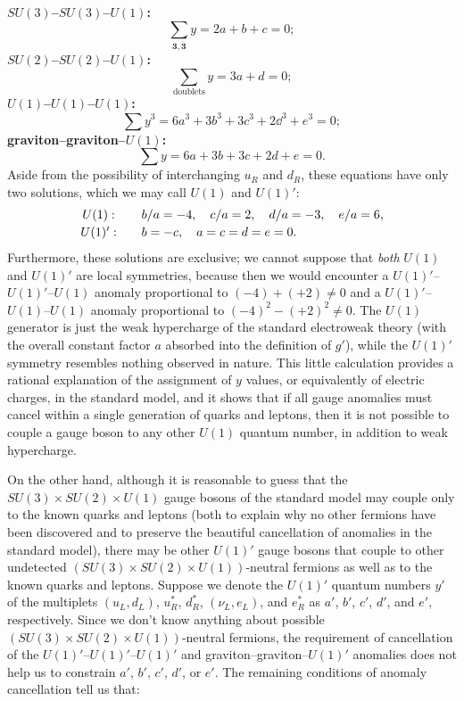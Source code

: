 \noindent\textbf{\boldmath$SU(3)$--$SU(3)$--$U(1)$:}
\[
 \sum_{\mathbf3,\overline{\mathbf3}}y=2a+b+c=0;
\]
\noindent\textbf{\boldmath$SU(2)$--$SU(2)$--$U(1)$:}
\[
 \sum_{\text{doublets}}y=3a+d=0;
\]
\noindent\textbf{\boldmath$U(1)$--$U(1)$--$U(1)$:}
\[
 \sum y^3=6a^3+3b^3+3c^3+2\dd^3+e^3=0;
\]
\noindent\textbf{graviton--graviton--\boldmath$U(1)$:}
\[
 \sum y=6a+3b+3c+2d+e=0.
\]
Aside from the possibility of interchanging $u_R$ and $d_R$, these
equations have only two solutions, which we may call $U(1)$ and $U(1)'$:
\[
 \begin{array}{c@{\qquad}l}
 U(1):&
 b/a=-4,\quad c/a=2,\quad d/a=-3,\quad e/a=6,\\[2pt]
 U(1)':&
 b=-c,\quad a=c=d=e=0.
 \end{array}
\]
Furthermore, these solutions are exclusive; we cannot suppose that
\emph{both} $U(1)$ and $U(1)'$ are local symmetries, because then we would
encounter a $U(1)'$--$U(1)'$--$U(1)$ anomaly proportional to
$(-4)+(+2)\neq0$ and a $U(1)'$--$U(1)$--$U(1)$ anomaly proportional to
$(-4)^2-(+2)^2\neq0$. The $U(1)$ generator is just the weak hypercharge of
the standard electroweak theory (with the overall constant factor $a$
absorbed into the definition of $g'$), while the $U(1)'$ symmetry resembles
nothing observed in nature. This little calculation provides a rational
explanation of the assignment of $y$ values, or equivalently of electric
charges, in the standard model, and it shows that if all gauge anomalies
must cancel within a single generation of quarks and leptons, then it is
not possible to couple a gauge boson to any other $U(1)$ quantum number,
in addition to weak hypercharge.

On the other hand, although it is reasonable to guess that the
$SU(3)\times SU(2)\times U(1)$ gauge bosons of the standard model may couple
only to the known quarks and leptons (both to explain why no other fermions
have been discovered and to preserve the beautiful cancellation of
anomalies in the standard model), there may be other $U(1)'$ gauge bosons
that couple to other undetected $(SU(3)\times SU(2)\times U(1))$-neutral
fermions as well as to the known quarks and leptons. Suppose we denote the
$U(1)'$ quantum numbers $y'$ of the multiplets $(u_L,d_L)$, $u_R^*$,
$d_R^*$, $(\nu_L,e_L)$, and $e_R^*$ as $a'$, $b'$, $c'$, $d'$, and $e'$,
respectively. Since we don't know anything about possible
$(SU(3)\times SU(2)\times U(1))$-neutral fermions, the requirement of
cancellation of the $U(1)'$--$U(1)'$--$U(1)'$ and
graviton--graviton--$U(1)'$ anomalies does not help us to constrain $a'$,
$b'$, $c'$, $d'$, or $e'$. The remaining conditions of anomaly
cancellation tell us that:

